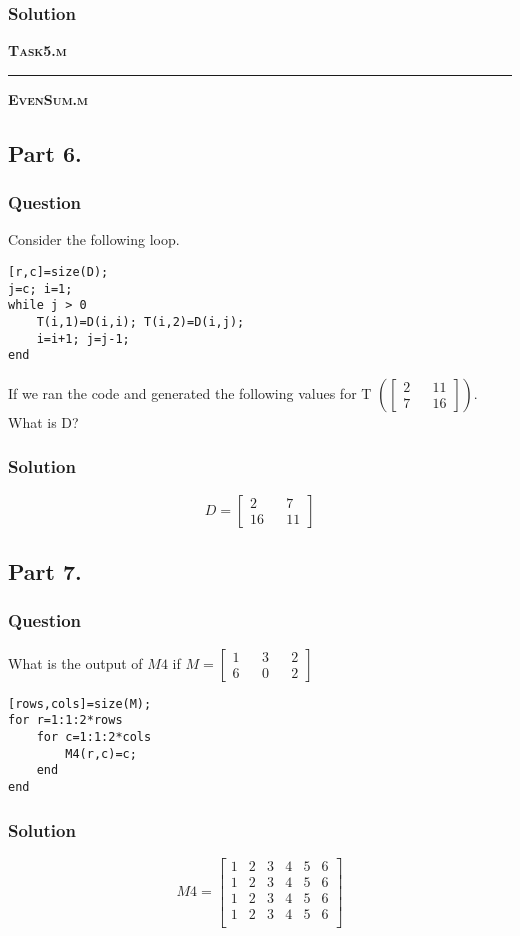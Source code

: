 \documentclass[a4paper, 10pt]{article}
\newcommand{\miniHeader}[1]{\begin{large}\textbf{\textsc{#1}}\end{large}}
\begin{document}
			\subsubsection{Solution}
				\miniHeader{Task5.m}
				
				
				\noindent \rule{\textwidth}{0.5pt} \miniHeader{EvenSum.m}
				
		
		\subsection{Part 6.}
			\subsubsection{Question}
				\noindent Consider the following loop.
				\begin{lstlisting}
[r,c]=size(D);
j=c; i=1;
while j > 0
	T(i,1)=D(i,i); T(i,2)=D(i,j);
	i=i+1; j=j-1;
end
				\end{lstlisting}
				\noindent If we ran the code and generated the following values for T $\left(\begin{bmatrix}2 && 11\\ 7 && 16\end{bmatrix}\right)$. What is D?
			\subsubsection{Solution}
				\[D = \begin{bmatrix}2 && 7\\ 16 && 11\end{bmatrix}\]
		\subsection{Part 7.}
			\subsubsection{Question}
				\noindent What is the output of $M4$ if $M = \begin{bmatrix}
					1 && 3 && 2 \\
					6 && 0 && 2
				\end{bmatrix}$ 
			
				\begin{lstlisting}
[rows,cols]=size(M);
for r=1:1:2*rows
	for c=1:1:2*cols
		M4(r,c)=c;
	end
end
				\end{lstlisting}
			\subsubsection{Solution}
				\[M4 = \begin{bmatrix}
					1 & 2 & 3 & 4 & 5 & 6 \\
					1 & 2 & 3 & 4 & 5 & 6 \\
					1 & 2 & 3 & 4 & 5 & 6 \\
					1 & 2 & 3 & 4 & 5 & 6 \\
				\end{bmatrix}\]
\end{document}
